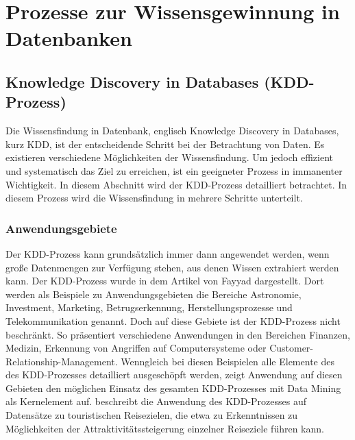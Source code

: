 %
%


\chapter{Prozesse zur Wissensgewinnung in Datenbanken}

\section{Knowledge Discovery in Databases (KDD-Prozess)}

Die Wissensfindung in Datenbank, englisch Knowledge Discovery in Databases, kurz KDD, ist der entscheidende Schritt bei der Betrachtung von Daten. Es existieren verschiedene Möglichkeiten der Wissensfindung. Um jedoch effizient und systematisch das Ziel zu erreichen, ist ein geeigneter Prozess in immanenter Wichtigkeit. In diesem Abschnitt wird der KDD-Prozess detailliert betrachtet. In diesem Prozess wird die Wissensfindung in mehrere Schritte unterteilt.  \cite{Dusing:2000}

\subsection{Anwendungsgebiete}
Der KDD-Prozess kann grundsätzlich immer dann angewendet werden, wenn große Datenmengen zur Verfügung stehen, aus denen Wissen extrahiert werden kann. Der KDD-Prozess wurde in dem Artikel von Fayyad dargestellt. \cite{Fayyad:1996}  Dort werden als Beispiele zu Anwendungsgebieten die Bereiche Astronomie, Investment, Marketing, Betrugserkennung, Herstellungsprozesse und Telekommunikation genannt. Doch auf diese Gebiete ist der KDD-Prozess nicht beschränkt. So präsentiert \cite{Maimon:2010} verschiedene Anwendungen in den Bereichen Finanzen, Medizin, Erkennung von Angriffen auf Computersysteme oder Customer-Relationship-Management. Wenngleich bei diesen Beispielen alle Elemente des des KDD-Prozesses detailliert ausgeschöpft werden, zeigt Anwendung auf diesen Gebieten den möglichen Einsatz des gesamten KDD-Prozesses mit Data Mining als Kernelement auf. \cite{Pyo:2002} beschreibt die Anwendung des KDD-Prozesses auf Datensätze zu touristischen Reisezielen, die etwa zu Erkenntnissen zu Möglichkeiten der Attraktivitätssteigerung einzelner Reiseziele führen kann.

